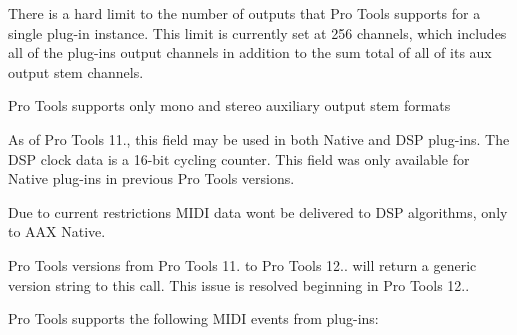 \begin{DoxyRefList}
\item[\label{a00381__compatibility_notes000052}%
\hypertarget{a00381__compatibility_notes000052}{}%
Member \hyperlink{a00088_a76266e8a07ce20cdbe5721172c32a93d}{A\+A\+X\+\_\+\+I\+Component\+Descriptor\+:\+:Add\+Aux\+Output\+Stem} (A\+A\+X\+\_\+\+C\+Field\+Index in\+Field\+Index, int32\+\_\+t in\+Stem\+Format, const char in\+Name\+U\+T\+F8\mbox{[}\mbox{]})=0]There is a hard limit to the number of outputs that Pro Tools supports for a single plug-\/in instance. This limit is currently set at 256 channels, which includes all of the plug-\/in\textquotesingle{}s output channels in addition to the sum total of all of its aux output stem channels.

Pro Tools supports only mono and stereo auxiliary output stem formats 
\item[\label{a00381__compatibility_notes000051}%
\hypertarget{a00381__compatibility_notes000051}{}%
Member \hyperlink{a00088_a59727dee1043fcd7f14da130ab254445}{A\+A\+X\+\_\+\+I\+Component\+Descriptor\+:\+:Add\+Clock} (A\+A\+X\+\_\+\+C\+Field\+Index in\+Field\+Index)=0]As of Pro Tools 11., this field may be used in both Native and D\+S\+P plug-\/ins. The D\+S\+P clock data is a 16-\/bit cycling counter. This field was only available for Native plug-\/ins in previous Pro Tools versions. 
\item[\label{a00381__compatibility_notes000054}%
\hypertarget{a00381__compatibility_notes000054}{}%
Member \hyperlink{a00088_a6284dda9ccca898e33075de29dad4e39}{A\+A\+X\+\_\+\+I\+Component\+Descriptor\+:\+:Add\+M\+I\+D\+I\+Node} (A\+A\+X\+\_\+\+C\+Field\+Index in\+Field\+Index, A\+A\+X\+\_\+\+E\+M\+I\+D\+I\+Node\+Type in\+Node\+Type, const char in\+Node\+Name\mbox{[}\mbox{]}, uint32\+\_\+t channel\+Mask)=0]Due to current restrictions M\+I\+D\+I data won\textquotesingle{}t be delivered to D\+S\+P algorithms, only to A\+A\+X Native. 
\item[\label{a00381__compatibility_notes000055}%
\hypertarget{a00381__compatibility_notes000055}{}%
Member \hyperlink{a00090_ad2a002a133491b2ed572054588641e78}{A\+A\+X\+\_\+\+I\+Controller\+:\+:Get\+Host\+Name} (\hyperlink{a00113}{A\+A\+X\+\_\+\+I\+String} $\ast$out\+Host\+Name\+String) const =0]Pro Tools versions from Pro Tools 11. to Pro Tools 12.. will return a generic version string to this call. This issue is resolved beginning in Pro Tools 12.. 
\item[\label{a00381__compatibility_notes000056}%
\hypertarget{a00381__compatibility_notes000056}{}%
Member \hyperlink{a00105_a5e1c5409158164f57376f908c9693a8b}{A\+A\+X\+\_\+\+I\+M\+I\+D\+I\+Node\+:\+:Post\+M\+I\+D\+I\+Packet} (\hyperlink{a00024}{A\+A\+X\+\_\+\+C\+Midi\+Packet} $\ast$packet)=0]Pro Tools supports the following M\+I\+D\+I events from plug-\/ins\+:

\end{DoxyRefList}
